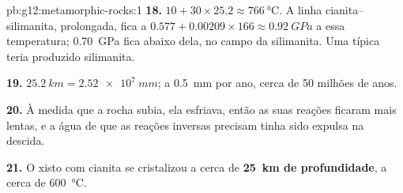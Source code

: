 \begin{solution}{pb:g12:metamorphic-rocks:1}
\textbf{18.} $10 + 30 \times 25.2 \approx \qty{766}{\celsius}$. A linha
cianita--silimanita, prolongada, fica a $0.577 + 0.00209 \times 166
\approx \qty{0.92}{GPa}$ a essa temperatura; \qty{0.70}{GPa} fica abaixo
dela, no campo da silimanita. Uma  típica teria produzido
silimanita.

\textbf{19.} $\qty{25.2}{km} = \qty{2.52e7}{mm}$; a \qty{0.5}{mm} por ano,
cerca de 50 milhões de anos.

\textbf{20.} À medida que a rocha subia, ela esfriava, então as suas reações
ficaram mais lentas, e a água de que as reações inversas precisam tinha sido
expulsa na descida.

\textbf{21.} O xisto com cianita se cristalizou a cerca de
\textbf{\qty{25}{km} de profundidade}, a cerca de \qty{600}{\celsius}.
\end{solution}
